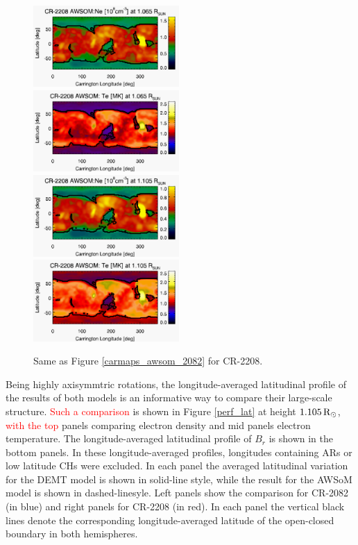\documentclass[namedreferences]{solarphysics}
\def\edit#1{\textcolor{Red}{#1}}
\newcommand{\mrsun}{{\rm R_\odot}}
\begin{document}
\begin{article}
\begin{figure}[h!]
\begin{center}
\includegraphics[width=0.495\textwidth]{figs/map_Ne_awsom_2208_185_short_1065_Rsun.pdf}
\includegraphics[width=0.495\textwidth]{figs/map_Te_awsom_2208_185_short_1065_Rsun.pdf}
\includegraphics[width=0.495\textwidth]{figs/map_Ne_awsom_2208_185_short_1105_Rsun.pdf}
\includegraphics[width=0.495\textwidth]{figs/map_Te_awsom_2208_185_short_1105_Rsun.pdf}
\caption{Same as Figure \ref{carmaps_awsom_2082} for CR-2208.}
\label{carmaps_awsom_2208}
\end{center}
\end{figure}

{Being highly axisymmtric rotations, the longitude-averaged latitudinal {profile} of the results of both models is an informative way to compare their large-scale structure. \edit{Such a comparison} is shown in Figure \ref{perf_lat} at height $1.105\,\mrsun$, \edit{with the top} panels comparing electron density and mid panels electron temperature. {The longitude-averaged latitudinal profile of $B_r$ is shown in the bottom panels.} In these longitude-averaged profiles, longitudes containing ARs or low latitude CHs were excluded. In each panel the averaged latitudinal variation for the DEMT model is shown in solid-line style, while the result for the AWSoM model is shown in dashed-linesyle. Left panels show the comparison for CR-2082 (in blue) and right panels for CR-2208 (in red). In each panel the vertical black lines denote the corresponding longitude-averaged latitude of the open-closed boundary in both hemispheres.}


\end{article}
\end{document}
